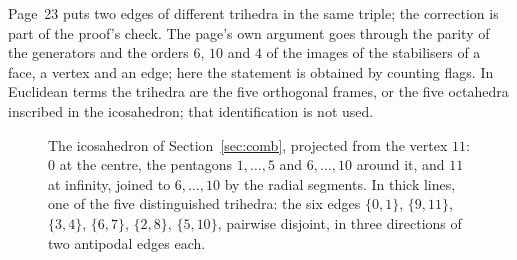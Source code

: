 \documentclass[11pt,a4paper]{amsart}
\theoremstyle{definition}
\theoremstyle{remark}
\begin{document}
Page~23 puts two edges of different trihedra in the same triple; the correction is part of the proof's check. The page's own argument goes through the parity of the generators and the orders $6$, $10$ and $4$ of the images of the stabilisers of a face, a vertex and an edge; here the statement is obtained by counting flags. In Euclidean terms the trihedra are the five orthogonal frames, or the five octahedra inscribed in the icosahedron; that identification is not used.

\begin{figure}[ht]
\centering
{}
\caption{The icosahedron of Section~\ref{sec:comb}, projected from the vertex $11$: $0$ at the centre, the pentagons $1, \dots, 5$ and $6, \dots, 10$ around it, and $11$ at infinity, joined to $6, \dots, 10$ by the radial segments. In thick lines, one of the five distinguished trihedra: the six edges $\{0,1\}$, $\{9,11\}$, $\{3,4\}$, $\{6,7\}$, $\{2,8\}$, $\{5,10\}$, pairwise disjoint, in three directions of two antipodal edges each.}\label{fig:triedre}
\end{figure}
\end{document}
